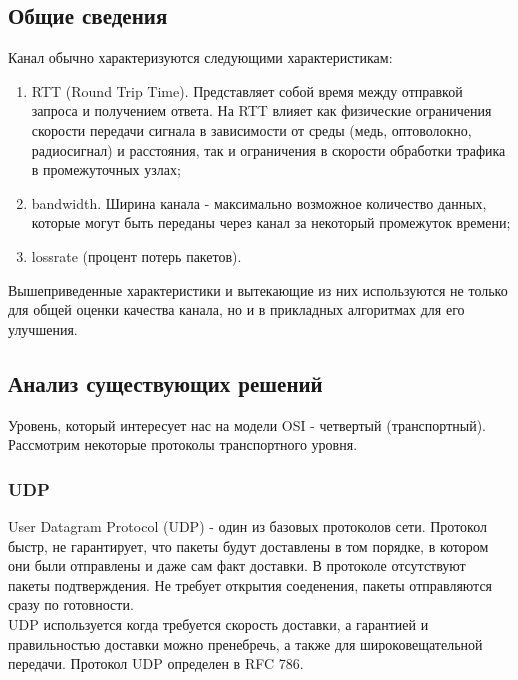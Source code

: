 \documentclass[14pt, a4paper]{extarticle}
\begin{document}
\subsection{Общие сведения}
Канал обычно характеризуются следующими характеристикам:
\begin{enumerate}
	\item RTT (Round Trip Time). Представляет собой время между отправкой запроса и получением ответа. На RTT влияет как физические ограничения скорости передачи 	сигнала в зависимости от среды (медь, оптоволокно, радиосигнал) и расстояния, так и ограничения в скорости обработки трафика в промежуточных узлах;
	\item bandwidth. Ширина канала - максимально возможное количество данных, которые могут быть переданы через канал за некоторый промежуток времени;
	\item lossrate (процент потерь пакетов).
\end{enumerate}
\indent \indent Вышеприведенные характеристики и вытекающие из них используются не только для общей оценки качества канала, но и в прикладных алгоритмах для его улучшения.

\subsection{Анализ существующих решений}
Уровень, который интересует нас на модели OSI - четвертый (транспортный). \\
Рассмотрим некоторые протоколы транспортного уровня.

\subsubsection{UDP}
User Datagram Protocol (UDP) - один из базовых протоколов сети. Протокол быстр, не гарантирует, что пакеты будут доставлены в том порядке, в котором они были отправлены и даже сам факт доставки. В протоколе отсутствуют пакеты подтверждения. Не требует открытия соеденения, пакеты отправляются сразу по готовности.\\
\indent  UDP используется когда требуется скорость доставки, а гарантией и правильностью доставки можно пренебречь, а также для широковещательной передачи. Протокол UDP определен в RFC 786\cite{rfc768}.
\end{document}
